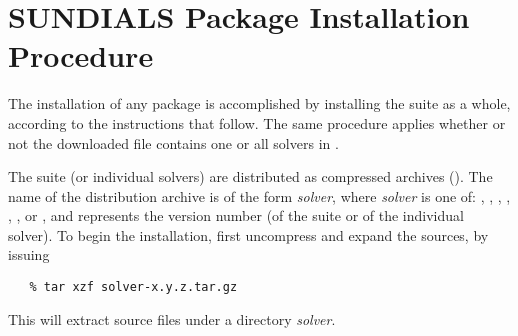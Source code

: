 \chapter{SUNDIALS Package Installation Procedure}\label{c:install}

The installation of any {\sundials} package is accomplished by installing the
{\sundials} suite as a whole, according to the instructions that follow. The
same procedure applies whether or not the downloaded file contains one or all
solvers in {\sundials}.

The {\sundials} suite (or individual solvers) are distributed as compressed
archives (). The name of the distribution archive is of the form
{\em solver}, where {\em solver} is one of: ,
, , , , , or , and
 represents the version number (of the {\sundials} suite or of the
individual solver).
To begin the installation, first uncompress and expand the sources, by issuing
\begin{verbatim}
   % tar xzf solver-x.y.z.tar.gz
\end{verbatim}
This will extract source files under a directory {\em solver}.

